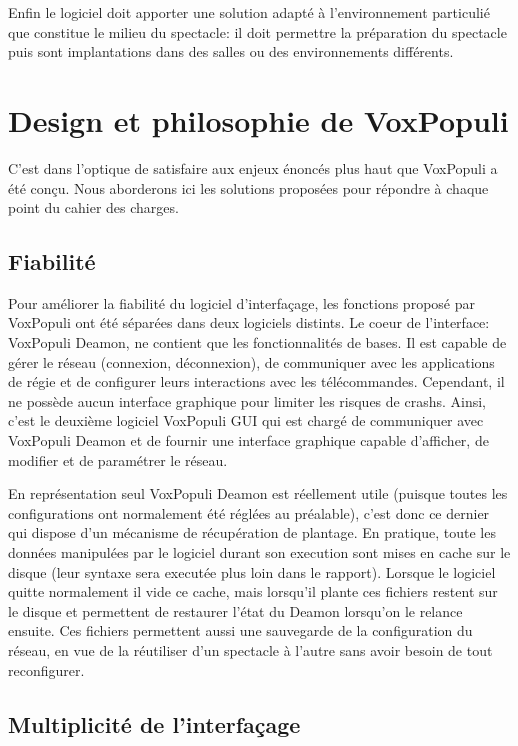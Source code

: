 \documentclass{Rapport}
\begin{document}
Enfin le logiciel doit apporter une solution adapté à l'environnement particulié que constitue le milieu du spectacle: il doit permettre la préparation du spectacle puis sont implantations dans des salles ou des environnements différents.

\pagebreak

\section{Design et philosophie de VoxPopuli}
C'est dans l'optique de satisfaire aux enjeux énoncés plus haut que VoxPopuli a été conçu. Nous aborderons ici les solutions proposées pour répondre à chaque point du cahier des charges.

\subsection*{Fiabilité}
Pour améliorer la fiabilité du logiciel d'interfaçage, les fonctions proposé par VoxPopuli ont été séparées dans deux logiciels distints. Le coeur de l'interface: VoxPopuli Deamon, ne contient que les fonctionnalités de bases. Il est capable de gérer le réseau (connexion, déconnexion), de communiquer avec les applications de régie et de configurer leurs interactions avec les télécommandes. Cependant, il ne possède aucun interface graphique pour limiter les risques de crashs. Ainsi, c'est le deuxième logiciel VoxPopuli GUI qui est chargé de communiquer avec VoxPopuli Deamon et de fournir une interface graphique capable d'afficher, de modifier et de paramétrer le réseau.

En représentation seul VoxPopuli Deamon est réellement utile (puisque toutes les configurations ont normalement été réglées au préalable), c'est donc ce dernier qui dispose d'un mécanisme de récupération de plantage. En pratique, toute les données manipulées par le logiciel durant son execution sont mises en cache sur le disque (leur syntaxe sera executée plus loin dans le rapport). Lorsque le logiciel quitte normalement il vide ce cache, mais lorsqu'il plante ces fichiers restent sur le disque et permettent de restaurer l'état du Deamon lorsqu'on le relance ensuite. Ces fichiers permettent aussi une sauvegarde de la configuration du réseau, en vue de la réutiliser d'un spectacle à l'autre sans avoir besoin de tout reconfigurer.

\subsection*{Multiplicité de l'interfaçage}
\end{document}
